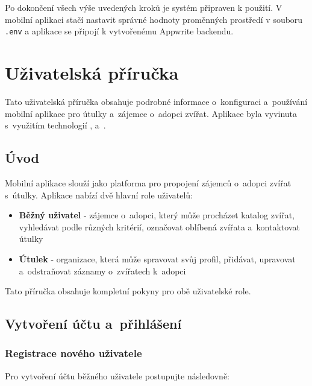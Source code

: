 \documentclass[czech, bp, kiv, he, iso690numb, pdf]{fasthesis}
\begin{document}
    Po dokončení všech výše uvedených kroků je systém připraven k použití. V mobilní aplikaci stačí nastavit správné hodnoty proměnných prostředí v souboru \texttt{.env} a aplikace se připojí k vytvořenému Appwrite backendu.






    \chapter{Uživatelská příručka}
    \label{app:user-manual}

    Tato uživatelská příručka obsahuje podrobné informace o~konfiguraci a~používání mobilní aplikace pro útulky a~zájemce o~adopci zvířat. Aplikace byla vyvinuta s~využitím technologií ,  a~.

    \section{Úvod}
    \label{sec:introduction}

    Mobilní aplikace slouží jako platforma pro propojení zájemců o~adopci zvířat s~útulky. Aplikace nabízí dvě hlavní role uživatelů:

    \begin{itemize}
        \item \textbf{Běžný uživatel} - zájemce o~adopci, který může procházet katalog zvířat, vyhledávat podle různých kritérií, označovat oblíbená zvířata a~kontaktovat útulky
        \item \textbf{Útulek} - organizace, která může spravovat svůj profil, přidávat, upravovat a~odstraňovat záznamy o~zvířatech k~adopci
    \end{itemize}

    Tato příručka obsahuje kompletní pokyny pro obě uživatelské role.


    \section{Vytvoření účtu a~přihlášení}
    \label{sec:account-management}

    \subsection*{Registrace nového uživatele}

    Pro vytvoření účtu běžného uživatele postupujte následovně:
\end{document}
